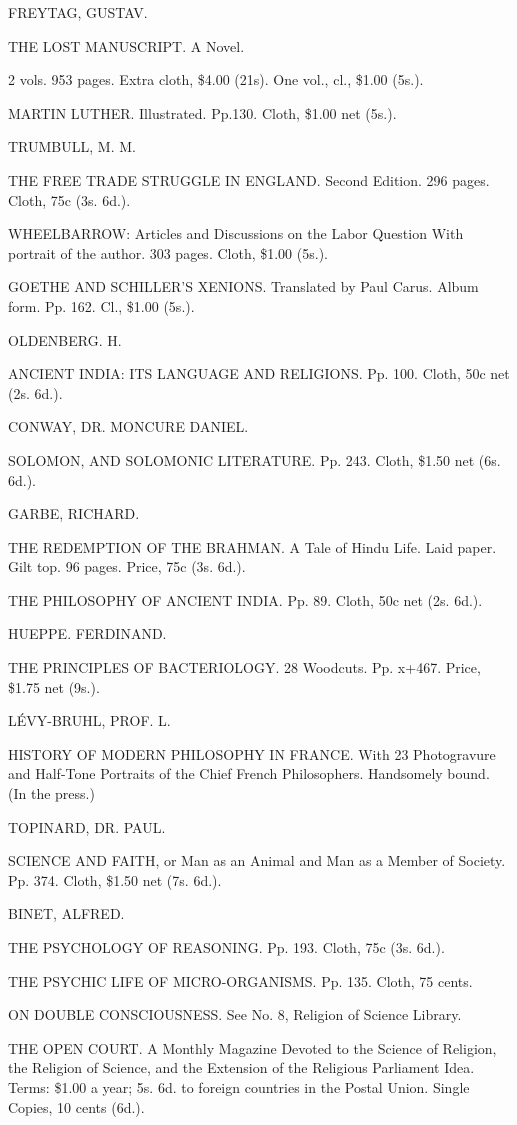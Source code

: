 \documentclass[12pt]{book}[2005/09/16]
\renewcommand{\(}{{\upshape(}}
\renewcommand{\)}{{\upshape)}}
\begin{document}
FREYTAG, GUSTAV.

THE LOST MANUSCRIPT. A Novel.

2 vols. 953 pages. Extra cloth, \$4.00 (21s). One vol., cl., \$1.00 (5s.).

MARTIN LUTHER.
Illustrated. Pp.130. Cloth, \$1.00 net (5s.).

TRUMBULL, M. M.

THE FREE TRADE STRUGGLE IN ENGLAND.
Second Edition. 296 pages. Cloth, 75c (3s. 6d.).

WHEELBARROW: Articles and Discussions on the Labor Question
With portrait of the author. 303 pages. Cloth, \$1.00 (5s.).


GOETHE AND SCHILLER'S XENIONS.
Translated by Paul Carus. Album form. Pp. 162. Cl., \$1.00 (5s.).


OLDENBERG. H.

ANCIENT INDIA: ITS LANGUAGE AND RELIGIONS.
Pp. 100. Cloth, 50c net (2s. 6d.).


CONWAY, DR. MONCURE DANIEL.

SOLOMON, AND SOLOMONIC LITERATURE.
Pp. 243. Cloth, \$1.50 net (6s. 6d.).


GARBE, RICHARD.

THE REDEMPTION OF THE BRAHMAN. A Tale of Hindu Life.
Laid paper. Gilt top. 96 pages. Price, 75c (3s. 6d.).

THE PHILOSOPHY OF ANCIENT INDIA.
Pp. 89. Cloth, 50c net (2s. 6d.).


HUEPPE. FERDINAND.

THE PRINCIPLES OF BACTERIOLOGY.
28 Woodcuts. Pp. x+467. Price, \$1.75 net (9s.).


LÉVY-BRUHL, PROF. L.

HISTORY OF MODERN PHILOSOPHY IN FRANCE.
With 23 Photogravure and Half-Tone Portraits of the Chief French
Philosophers. Handsomely bound. (In the press.)


TOPINARD, DR. PAUL.

SCIENCE AND FAITH, or Man as an Animal and Man as a Member
of Society.
Pp. 374. Cloth, \$1.50 net (7s. 6d.).


BINET, ALFRED.

THE PSYCHOLOGY OF REASONING.
Pp. 193. Cloth, 75c (3s. 6d.).

THE PSYCHIC LIFE OF MICRO-ORGANISMS.
Pp. 135. Cloth, 75 cents.

ON DOUBLE CONSCIOUSNESS.
See No. 8, Religion of Science Library.


THE OPEN COURT.
A Monthly Magazine Devoted to the Science of Religion, the Religion of
Science, and the Extension of the Religious Parliament Idea.
Terms: \$1.00 a year; 5s. 6d. to foreign countries in the Postal Union.
Single Copies, 10 cents (6d.).
\end{document}
